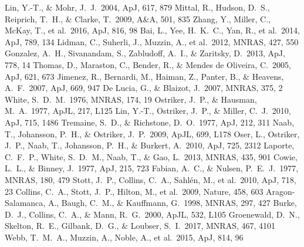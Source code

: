 \documentclass[
12pt, %
spanish,
singlespacing, %
headsepline, %
]{MastersDoctoralThesis} %
\def\apj {ApJ}
\def\apjl {ApJL}
\def\aap {A\&A}
\def\mnras {MNRAS}
\def\apj {ApJ}
\def\nat {Nature}
\begin{document}
\begin{thebibliography}{X}
    Lin, Y.-T., \& Mohr, J.~J.\ 2004, \apj, 617, 879 
    Mittal, R., Hudson, D.~S., Reiprich, T.~H., \& Clarke, T.\ 2009, \aap, 501, 835 
    Zhang, Y., Miller, C., McKay, T., et al.\ 2016, \apj, 816, 98
    Bai, L., Yee, H.~K.~C., Yan, R., et al.\ 2014, \apj, 789, 134 
    Lidman, C., Suherli, J., Muzzin, A., et al.\ 2012, \mnras, 427, 550 
    Gonzalez, A.~H., Sivanandam, S., Zabludoff, A.~I., \& Zaritsky, D.\ 2013, \apj, 778, 14 
    Thomas, D., Maraston, C., Bender, R., \& Mendes de Oliveira, C.\ 2005, \apj, 621, 673  
    Jimenez, R., Bernardi, M., Haiman, Z., Panter, B., \& Heavens, A.~F.\ 2007, \apj, 669, 947 
    De Lucia, G., \& Blaizot, J.\ 2007, \mnras, 375, 2 
    White, S.~D.~M.\ 1976, \mnras, 174, 19 
    Ostriker, J.~P., \& Hausman, M.~A.\ 1977, \apjl, 217, L125 
    Lin, Y.-T., Ostriker, J.~P., \& Miller, C.~J.\ 2010, \apj, 715, 1486 
    Tremaine, S.~D., \& Richstone, D.~O.\ 1977, \apj, 212, 311 
    Naab, T., Johansson, P.~H., \& Ostriker, J.~P.\ 2009, \apjl, 699, L178 
    Oser, L., Ostriker, J.~P., Naab, T., Johansson, P.~H., \& Burkert, A.\ 2010, \apj, 725, 2312 
    Laporte, C.~F.~P., White, S.~D.~M., Naab, T., \& Gao, L.\ 2013, \mnras, 435, 901 
    Cowie, L.~L., \& Binney, J.\ 1977, \apj, 215, 723 
    Fabian, A.~C., \& Nulsen, P.~E.~J.\ 1977, \mnras, 180, 479 
    Stott, J.~P., Collins, C.~A., Sahl{\'e}n, M., et al.\ 2010, \apj, 718, 23 
    Collins, C.~A., Stott, J.~P., Hilton, M., et al.\ 2009, \nat, 458, 603 
    Aragon-Salamanca, A., Baugh, C.~M., \& Kauffmann, G.\ 1998, \mnras, 297, 427 
    Burke, D.~J., Collins, C.~A., \& Mann, R.~G.\ 2000, \apjl, 532, L105 
    Groenewald, D.~N., Skelton, R.~E., Gilbank, D.~G., \& Loubser, S.~I.\ 2017, \mnras, 467, 4101 
    Webb, T.~M.~A., Muzzin, A., Noble, A., et al.\ 2015, \apj, 814, 96 
  
  
  
\end{thebibliography}

  
\end{document}
